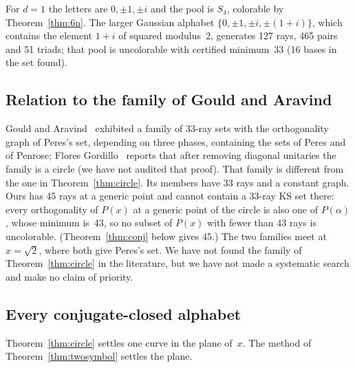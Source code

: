 For $d=1$ the letters are $0,\pm1,\pm i$ and the pool is $S_4$, colorable by
Theorem~\ref{thm:6n}.  The larger Gaussian alphabet $\{0,\pm1,\pm i,\pm(1+i)\}$, which contains
the element $1+i$ of squared modulus~2, generates 127 rays, 465 pairs and 51 triads; that pool is
uncolorable with certified minimum~33 (16 bases in the set found).

\subsection{Relation to the family of Gould and Aravind}

Gould and Aravind~\cite{GouldAravind2010} exhibited a family of 33-ray sets with the
orthogonality graph of Peres's set, depending on three phases, containing the sets of Peres and
of Penrose; Flores Gordillo~\cite{FloresGordillo2026} reports that after removing diagonal
unitaries the family is a circle (we have not audited that proof).  That family is different from the one in
Theorem~\ref{thm:circle}.  Its members have 33 rays and a constant graph.  Ours has 45 rays at a
generic point and cannot contain a 33-ray KS set there: every orthogonality of $P(x)$ at a generic
point of the circle is also one of $P(\alpha)$, whose minimum is~43, so no subset of $P(x)$ with
fewer than 43 rays is uncolorable.  (Theorem~\ref{thm:conj} below gives 45.)  The two families meet at $x=\sqrt2$, where both give Peres's
set.  We have not found the family of Theorem~\ref{thm:circle} in the literature, but we have not
made a systematic search and make no claim of priority.

\subsection{Every conjugate-closed alphabet}\label{sec:conjclosed}

Theorem~\ref{thm:circle} settles one curve in the plane of~$x$.  The method of
Theorem~\ref{thm:twosymbol} settles the plane.

